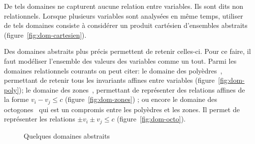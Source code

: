 De tels domaines ne capturent aucune relation entre variables. Ils sont dits non
relationnels. Lorsque plusieurs variables sont analysées en même temps, utiliser
de tels domaines consiste à considérer un produit cartésien d'ensembles
abstraits (figure~\ref{fig:dom-cartesien}).

Des domaines abstraits plus précis permettent de retenir celles-ci. Pour ce
faire, il faut modéliser l'ensemble des valeurs des variables comme un tout.
Parmi les domaines relationnels courants on peut citer: le domaine des
polyèdres~\cite{CousotHalbwachs78}, permettant de retenir tous les invariants
affines entre variables (figure~\ref{fig:dom-poly}); le domaine des
zones~\cite{mineZones}, permettant de représenter des relations affines de la
forme $v_i - v_j \le c$ (figure~\ref{fig:dom-zones}) ; ou encore le domaine des
octogones~\cite{mineOctagons} qui est un compromis entre les polyèdres et les
zones. Il permet de représenter les relations $\pm v_i \pm v_j \le c$
(figure~\ref{fig:dom-octo}).

\begin{figure}[b]%

  \centering

  \subbottom[Domaine des polyèdres]{%
\label{fig:dom-poly}
%
    \begin{tikzpicture}[scale=0.5]
    \path[use as bounding box] (0,0) rectangle (8, 6);
%
    \draw[fill=red!30] (1,2) -- (2,4) -- (4,5) -- (6,5) -- (7,3) -- (5,1) -- cycle;
%
    \end{tikzpicture}
  }%

  \subbottom[Domaine des zones]{%
\label{fig:dom-zones}
%
    \begin{tikzpicture}
    \path[use as bounding box] (0,0) rectangle (4,4);
%
    \draw[fill=red!30] (1,2) -- (2,3) -- (3,3) -- (3,2) -- (2,1) -- (1,1) -- cycle;
%
    \end{tikzpicture}
  }%
  \subbottom[Domaine des octaèdres]{%
\label{fig:dom-octo}
%
    \begin{tikzpicture}
    \path[use as bounding box] (0,0) rectangle (4,4);
%
    \draw[fill=red!30] (1,1.5) -- (1,2) -- (2,3) -- (2.5,3) -- (3,2.5) -- (3,2) -- (2,1) -- (1.5,1) -- cycle;
%
    \end{tikzpicture}
  }%

  \caption{Quelques domaines abstraits}
\label{fig:dom-abstraits}
\end{figure}%

